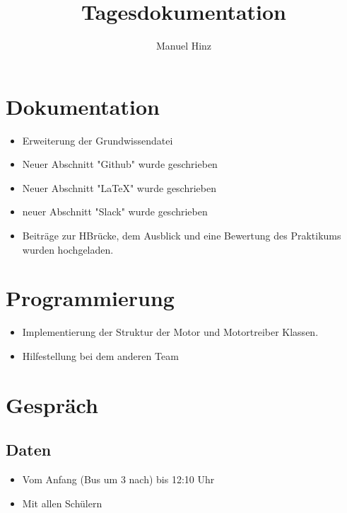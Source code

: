\documentclass{article}
\author{Manuel Hinz}
\title{Tagesdokumentation}
\begin{document}
\maketitle

\section{Dokumentation}

\begin{itemize}

\item Erweiterung der Grundwissendatei

\item Neuer Abschnitt "Github" wurde geschrieben

\item Neuer Abschnitt "LaTeX" wurde geschrieben

\item neuer Abschnitt "Slack" wurde geschrieben

\item Beitr\"{a}ge zur HBr\"{u}cke, dem Ausblick und eine Bewertung des Praktikums wurden hochgeladen.

\end{itemize}

\section{Programmierung}

\begin{itemize}

\item Implementierung der Struktur der Motor und Motortreiber Klassen.

\item Hilfestellung bei dem anderen Team

\end{itemize}

\section{Gespr\"{a}ch}

\subsection{Daten}

\begin{itemize}

\item Vom Anfang (Bus um 3 nach) bis 12:10 Uhr

\item Mit allen Sch\"{u}lern

\end{itemize}
\end{document}
